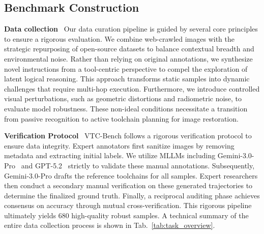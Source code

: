 \documentclass[runningheads]{llncs}
\newcommand{\benchname}{VTC-Bench\xspace}
\begin{document}
\subsection{Benchmark Construction}\label{sec:construction}
\noindent \textbf{Data collection}~
Our data curation pipeline is guided by several core principles to ensure a rigorous evaluation. We combine web-crawled images with the strategic repurposing of open-source datasets to balance contextual breadth and environmental noise. Rather than relying on original annotations, we synthesize novel instructions from a tool-centric perspective to compel the exploration of latent logical reasoning. This approach transforms static samples into dynamic challenges that require multi-hop execution. Furthermore, we introduce controlled visual perturbations, such as geometric distortions and radiometric noise, to evaluate model robustness. These non-ideal conditions necessitate a transition from passive recognition to active toolchain planning for image restoration.

\noindent \textbf{Verification Protocol}~
\benchname follows a rigorous verification protocol to ensure data integrity. Expert annotators first sanitize images by removing metadata and extracting initial labels. 
We utilize MLLMs including Gemini-3.0-Pro~\cite{google2026gemini} and GPT-5.2~\cite{openai2025gpt52} strictly to validate these manual annotations. Subsequently, Gemini-3.0-Pro drafts the reference toolchains for all samples. Expert researchers then conduct a secondary manual verification on these generated trajectories to determine the finalized ground truth. Finally, a reciprocal auditing phase achieves consensus on accuracy through mutual cross-verification. This rigorous pipeline ultimately yields 680 high-quality robust samples. A technical summary of the entire data collection process is shown in Tab.~\ref{tab:task_overview}. 
\end{document}
